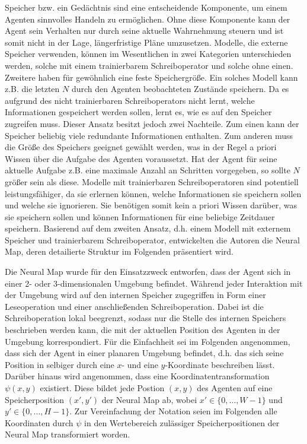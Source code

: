 Speicher bzw. ein Gedächtnis sind eine entscheidende Komponente, um einem Agenten sinnvolles Handeln zu ermöglichen. Ohne diese Komponente kann der Agent sein Verhalten nur durch seine aktuelle Wahrnehmung steuern und ist somit nicht in der Lage, längerfristige Pläne umzusetzen. Modelle, die externe Speicher verwenden, können im Wesentlichen in zwei Kategorien unterschieden werden, solche mit einem trainierbarem Schreiboperator und solche ohne einen. Zweitere haben für gewöhnlich eine feste Speichergröße. Ein solches Modell kann z.B. die letzten $N$ durch den Agenten beobachteten Zustände speichern. Da es aufgrund des nicht trainierbaren Schreiboperators nicht lernt, welche Informationen gespeichert werden sollen, lernt es, wie es auf den Speicher zugreifen muss. Dieser Ansatz besitzt jedoch zwei Nachteile. Zum einen kann der Speicher beliebig viele redundante Informationen enthalten. Zum anderen muss die Größe des Speichers geeignet gewählt werden, was in der Regel a priori Wissen über die Aufgabe des Agenten voraussetzt. Hat der Agent für seine aktuelle Aufgabe z.B. eine maximale Anzahl an Schritten vorgegeben, so sollte $N$ größer sein als diese. Modelle mit trainierbaren Schreiboperatoren sind potentiell leistungsfähiger, da sie erlernen können, welche Informationen sie speichern sollen und welche sie ignorieren. Sie benötigen somit kein a priori Wissen darüber, was sie speichern sollen und können Informationen für eine beliebige Zeitdauer speichern. Basierend auf dem zweiten Ansatz, d.h. einem Modell mit externem Speicher und trainierbarem Schreiboperator, entwickelten die Autoren die Neural Map, deren detailierte Struktur im Folgenden präsentiert wird.

Die Neural Map wurde für den Einsatzzweck entworfen, dass der Agent sich in einer 2- oder 3-dimensionalen Umgebung befindet. Während jeder Interaktion mit der Umgebung wird auf den internen Speicher zugegriffen in Form einer Leseoperation und einer anschließenden Schreiboperation. Dabei ist die Schreiboperation lokal beegrenzt, sodass nur die Stelle des internen Speichers beschrieben werden kann, die mit der aktuellen Position des Agenten in der Umgebung korrespondiert. Für die Einfachheit sei im Folgenden angenommen, dass sich der Agent in einer planaren Umgebung befindet, d.h. das sich seine Position in selbiger durch eine $x$- und eine $y$-Koordinate beschreiben lässt. Darüber hinaus wird angenommen, dass eine Koordinatentransformation $\psi(x,y)$ existiert. Diese bildet jede Postion $(x,y)$ des Agenten auf eine Speicherposition $(x',y')$ der Neural Map ab, wobei $x' \in \{0, \dots, W-1\}$ und $y' \in \{0, \dots, H-1\}$. Zur Vereinfachung der Notation seien im Folgenden alle Koordinaten durch $\psi$ in den Wertebereich zulässiger Speicherpositionen der Neural Map transformiert worden.

